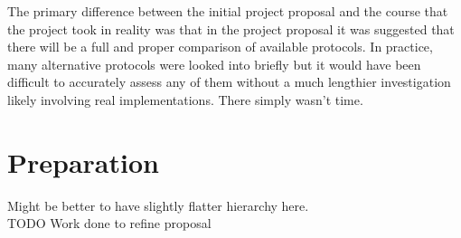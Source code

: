\documentclass[12pt]{article}
\begin{document}
The primary difference between the initial project proposal and the course that the project took in reality was that in the project proposal it was suggested that there will be a full and proper comparison of available protocols. In practice, many alternative protocols were looked into briefly but it would have been difficult to  accurately assess any of them without a much lengthier investigation likely involving real implementations. There simply wasn't time.


\section{Preparation}
Might be better to have slightly flatter hierarchy here.\\

TODO Work done to refine proposal\\
\end{document}
